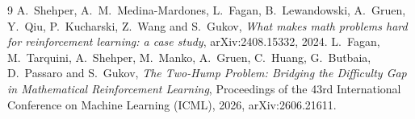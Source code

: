 \begin{thebibliography}{9}
 A.~Shehper, A.~M.~Medina-Mardones, L.~Fagan, B.~Lewandowski, A.~Gruen, Y.~Qiu, P.~Kucharski,
Z.~Wang and S.~Gukov, \emph{What makes math problems hard for reinforcement learning: a case study}, arXiv:2408.15332,
2024.
 L.~Fagan, M.~Tarquini, A.~Shehper, M.~Manko, A.~Gruen, C.~Huang, G.~Butbaia, D.~Passaro and
S.~Gukov, \emph{The Two-Hump Problem: Bridging the Difficulty Gap in Mathematical Reinforcement Learning}, Proceedings
of the 43rd International Conference on Machine Learning (ICML), 2026, arXiv:2606.21611.
\end{thebibliography}
